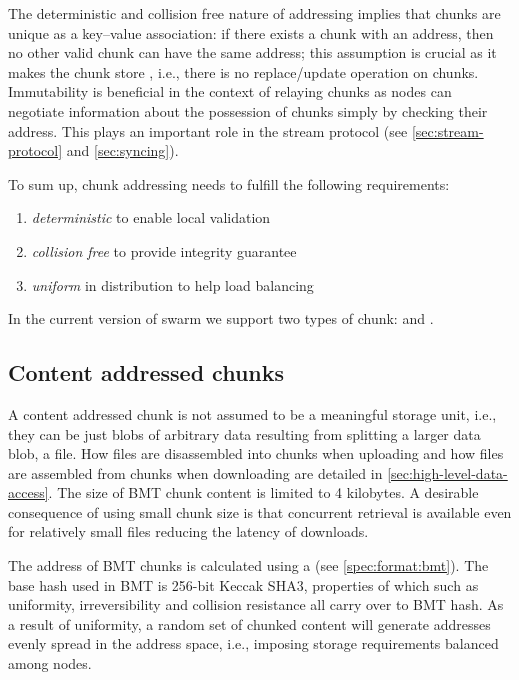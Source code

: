 The deterministic and collision free nature of addressing implies that chunks are unique as a key--value association: if there exists a chunk with an address, then no other valid chunk can have the same address; this assumption is crucial as it makes the chunk store , i.e., there is no replace/update operation on chunks. Immutability is beneficial in the context of relaying chunks as nodes can negotiate information about the possession of chunks simply by checking their address. This plays an important role in the stream protocol (see \ref{sec:stream-protocol} and \ref{sec:syncing}).

To sum up, chunk addressing needs to fulfill the following requirements:

\begin{enumerate}
    \item \emph{deterministic} to enable local validation
    \item \emph{collision free} to provide integrity guarantee
    \item \emph{uniform} in distribution to help load balancing
\end{enumerate}

In the current version of swarm we support two types of chunk:  and . 

\subsection{Content addressed  chunks}\label{sec:content-addressed-chunks}

A content addressed chunk is not assumed to be a meaningful storage unit, i.e., they can be just blobs of arbitrary data resulting from splitting a larger data blob, a file. How files are disassembled into chunks when uploading and how files are assembled from chunks when downloading are detailed in \ref{sec:high-level-data-access}. The size of BMT chunk content is limited to 4 kilobytes. A desirable consequence of using small chunk size is that concurrent retrieval is available even for relatively small files reducing the latency of downloads. 

The address of BMT chunks is calculated using a  (see \ref{spec:format:bmt}). The base hash used in BMT is 256-bit Keccak SHA3, properties of which such as uniformity, irreversibility and collision resistance all carry over to BMT hash. As a result of uniformity, a random set of chunked content will generate addresses evenly spread in the address space, i.e., imposing storage requirements balanced among nodes.

